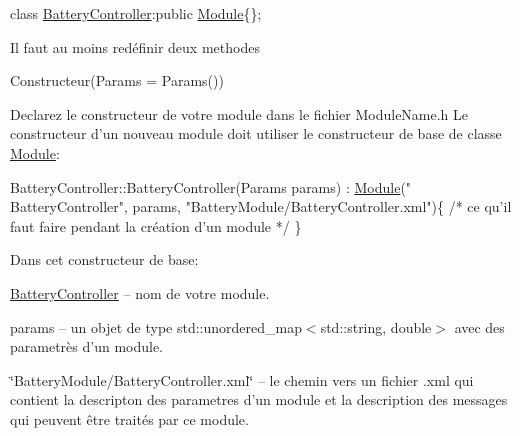 {\ttfamily class \hyperlink{classBatteryController}{Battery\-Controller}\-:public \hyperlink{classModule}{Module}\{\};}

Il faut au moins redéfinir deux methodes
\begin{DoxyItemize}
\item {\ttfamily Constructeur(Params = Params())}

Declarez le constructeur de votre module dans le fichier Module\-Name.\-h Le constructeur d'un nouveau module doit utiliser le constructeur de base de classe \hyperlink{classModule}{Module}\-:


\begin{DoxyCode}
BatteryController::BatteryController(Params params) : \hyperlink{classModule}{Module}(\textcolor{stringliteral}{"
      BatteryController"}, params, \textcolor{stringliteral}{"BatteryModule/BatteryController.xml"})\{
   \textcolor{comment}{/* ce qu'il faut faire pendant la création d'un module */}
\}
\end{DoxyCode}


Dans cet constructeur de base\-:
\begin{DoxyEnumerate}
\item \hyperlink{classBatteryController}{Battery\-Controller} – nom de votre module.
\item params – un objet de type {\ttfamily std\-::unordered\-\_\-map$<$std\-::string, double$>$} avec des parametrès d'un module.
\item \char`\"{}\-Battery\-Module/\-Battery\-Controller.\-xml\char`\"{} – le chemin vers un fichier {\ttfamily .xml} qui contient la descripton des parametres d'un module et la description des messages qui peuvent être traités par ce module.
\end{DoxyEnumerate}
\end{DoxyItemize}


